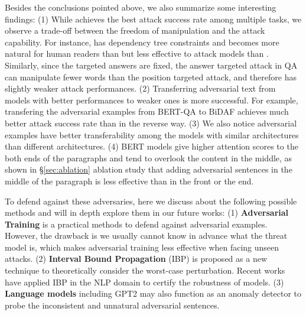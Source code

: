 Besides the conclusions pointed above, we also summarize some interesting findings: %
(1) While \advcodecword achieves the best attack success rate among multiple tasks, we observe a trade-off between the freedom of manipulation and the attack capability. For instance, \advcodecsent has dependency tree constraints and becomes more natural for human readers than but less effective to attack models than \advcodecword. Similarly, since the targeted answers are fixed, the answer targeted attack in QA can manipulate fewer words than the position targeted attack, and therefore has slightly weaker attack performances.
(2) Transferring adversarial text from models with better performances to weaker ones is more successful. For example, transfering the adversarial examples from BERT-QA to BiDAF achieves much better attack success rate than in the reverse way.
(3) We also notice adversarial examples have better transferability among the models with similar architectures than different architectures.
(4) BERT models give higher attention scores to the both ends of the paragraphs and tend to overlook the content in the middle, as shown in \S \ref{sec:ablation} ablation study that adding adversarial sentences in the middle of the paragraph is less effective than in the front or the end.

To defend against these adversaries, here we discuss about the following possible methods and will in depth explore them in our future works: 
(1) \textbf{Adversarial Training} is a practical methods to defend against adversarial examples. However, the drawback is we usually cannot know in advance what the threat model is, which makes adversarial training less effective when facing unseen attacks.
(2) \textbf{Interval Bound Propagation} (IBP) \citep{Dvijotham2018TrainingVL} is proposed as a new technique to theoretically consider the worst-case perturbation. Recent works \citep{Jia2019CertifiedRT,Huang2019AchievingVR} have applied IBP in the NLP domain to certify the robustness of models. (3) \textbf{Language models} including GPT2 \citep{Radford2019LanguageMA} may also function as an anomaly detector to probe the inconsistent and unnatural adversarial sentences.

